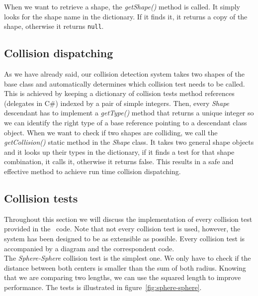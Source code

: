 

When we want to retrieve a shape, the \textit{getShape()} method is called. It simply
looks for the shape name in the dictionary. If it finds it, it returns a copy of the
shape, otherwise it returns \texttt{null}.\\



\subsection{Collision dispatching}

As we have already said, our collision detection system takes two shapes of the base class
and automatically determines which collision test needs to be called. This is achieved by
keeping a dictionary of collision tests method references (delegates in C\#) indexed by
a pair of simple integers. Then, every \textit{Shape} descendant has to implement a
\textit{getType()} method that returns a unique integer so we can identify the right
type of a base reference pointing to a descendant class object. When we want to check if
two shapes are colliding, we call the \textit{getCollision()} static method in the
\textit{Shape} class. It takes two general shape objects and it looks up their types
in the dictionary, if it finds a test for that shape combination, it calls it, otherwise
it returns false. This results in a safe and effective method to achieve run time collision
dispatching.\\




\subsection{Collision tests}

Throughout this section we will discuss the implementation of every collision test provided
in the \game\ code. Note that not every collision test is used, however, the system has been
designed to be as extensible as possible. Every collision test is accompanied by a diagram
and the correspondent code.\\

The \textit{Sphere-Sphere} collision test is the simplest one. We only have to check if
the distance between both centers is smaller than the sum of both radius. Knowing that we are
comparing two lengths, we can use the squared length to improve performance. The tests is
illustrated in figure~\ref{fig:sphere-sphere}.\\

